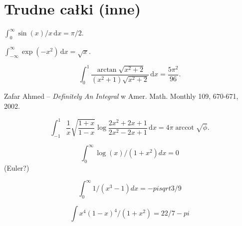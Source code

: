 \section{Trudne całki (inne)}




\begin{problem}
    $\int_0^\infty \sin(x) / x \,\mathrm{d}x = \pi/2$.
\end{problem}

\begin{problem}
    $\int_{-\infty}^\infty \exp(-x^2) \,\mathrm{d}x = \sqrt x$.
\end{problem}

\begin{problem}
    \begin{equation}
        \int_0^1 \frac{\arctan \sqrt{x^2+2}}{(x^2+1) \sqrt{x^2+2}} \,\mathrm{d}x = \frac{5\pi^2}{96}.
    \end{equation}
\end{problem}

\begin{solution}
    Zafar Ahmed -- \emph{Definitely An Integral} w Amer. Math. Monthly 109, 670-671, 2002.
\end{solution}

\begin{problem}
    \begin{equation}
        \int_{-1}^1 \frac{1}{x} \sqrt{\frac{1+x}{1-x}} \log \frac{2x^2+2x+1}{2x^2-2x+1} \,\mathrm{d}x = 4 \pi \operatorname{arccot} \sqrt{\phi}.
    \end{equation}
\end{problem}

$$\int_0^\infty \log(x) / (1+x^2) dx = 0$$ (Euler?)

$$\int_0^\infty 1/(x^3 - 1) dx = -pi sqrt 3 / 9$$

$$ \int x^4 (1-x)^4 / (1+x^2) = 22/7 - pi$$




